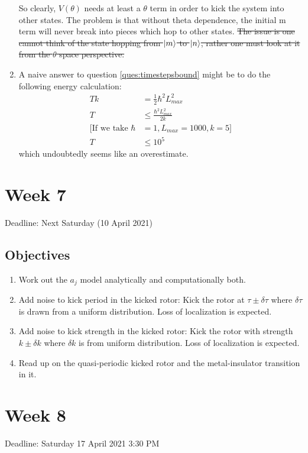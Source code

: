 \documentclass[12pt]{article}
\begin{document}
\begin{enumerate}
    So clearly, $V(\theta)$ needs at least a $\theta$ term in order to kick the system into other states. The
    problem is that without theta dependence, the initial m term will never break into pieces which hop to other
    states. \sout{The issue is one cannot think of the state hopping from $\ket{m}$ to $\ket{n}$, rather one must look at it from the $\theta$ space perspective.}
    
    \item A naive answer to question \ref{ques:timestepsbound} might be to do the following energy calculation:
    \begin{align}
        T k &= \frac{1}{2} \hbar^2 L_{max}^2 \\
        T &\leq \frac{\hbar^2 L_{max}^2}{2 k} \\
        [\text{If we take } \hbar &= 1, L_{max} = 1000, k = 5] \nonumber \\
        T &\leq 10^5
    \end{align}
    which undoubtedly seems like an overestimate.
\end{enumerate}

\section{Week 7}
Deadline: Next Saturday (10 April 2021)
\subsection{Objectives}
\begin{enumerate}
    \item Work out the $a_j$ model analytically and computationally both.
    
    \item Add noise to kick period in the kicked rotor:
    Kick the rotor at $\tau \pm \delta\tau$ where $\delta\tau$ is drawn from a uniform distribution.
    Loss of localization is expected.
    
    \item Add noise to kick strength in the kicked rotor:
    Kick the rotor with strength $k \pm \delta k$ where $\delta k$ is from uniform distribution.
    Loss of localization is expected.
    
    \item Read up on the quasi-periodic kicked rotor and the metal-insulator transition in it.
\end{enumerate}

\section{Week 8}
Deadline: Saturday 17 April 2021 3:30 PM
\end{document}
